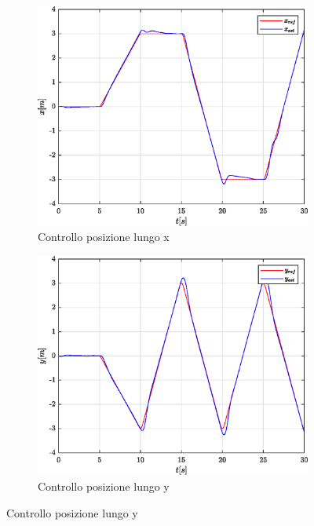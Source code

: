 \begin{figure}
	\centering
	\begin{subfigure}{0.45\textwidth}
		\centering
		\includegraphics[width=1\textwidth]{Simulazioni/Figure/SMC/BUTTERFLY/PositionControlXPos}
		\caption{Controllo posizione lungo x}
	\end{subfigure}
	\hfill
	\begin{subfigure}{0.45\textwidth}
		\centering
		\includegraphics[width=1\textwidth]{Simulazioni/Figure/SMC/BUTTERFLY/PositionControlYPos}
		\caption{Controllo posizione lungo y}
	\end{subfigure}

\end{figure}
